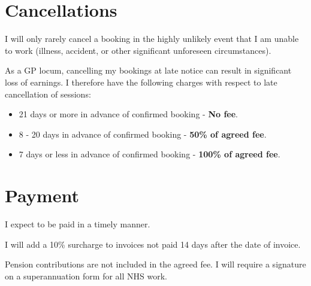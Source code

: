 \documentclass[12pt, a4paper]{article}
\begin{document}
\section{Cancellations}

I will only rarely cancel a booking in the highly unlikely event that I am unable to work (illness, accident, or other significant unforeseen circumstances).

As a GP locum, cancelling my bookings at late notice can result in significant loss of earnings.
I therefore have the following charges with respect to late cancellation of sessions:

\begin{itemize}
  \item 21 days or more in advance of confirmed booking - \textbf{No fee}.
  \item 8 - 20 days in advance of confirmed booking - \textbf{50\% of agreed fee}.
  \item 7 days or less in advance of confirmed booking - \textbf{100\% of agreed fee}.
\end{itemize}

\section{Payment}

I expect to be paid in a timely manner.

I will add a 10\% surcharge to invoices not paid 14 days after the date of invoice.

Pension contributions are not included in the agreed fee.
I will require a signature on a superannuation form for all NHS work.
\end{document}
